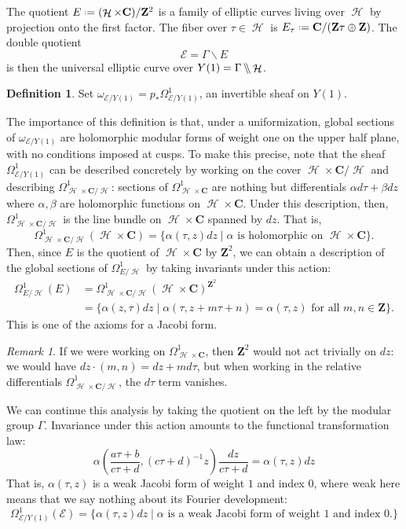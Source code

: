 \documentclass[12pt]{amsart}
\theoremstyle{plain}
\theoremstyle{definition}
\newtheorem{dfn}[thm]{Definition}
\theoremstyle{remark}
\newtheorem{rmk}[thm]{Remark}
\newcommand{\cE}{\mathcal{E}}
\DeclareMathOperator{\uhp}{\mathcal{H}}
\newcommand*{\df}{\mathrel{\vcenter{\baselineskip0.5ex \lineskiplimit0pt
                     \hbox{\scriptsize.}\hbox{\scriptsize.}}} =}
\newcommand{\CC}{\mathbf{C}}
\newcommand{\ZZ}{\mathbf{Z}}
\DeclareMathOperator{\obackslash}{\backslash\hspace{-3pt}\backslash}
\begin{document}
The quotient $E\df (\uhp\times \CC) / \ZZ^2$ is a family of elliptic curves living over $\uhp$ by projection onto the first factor. The fiber over $\tau \in \uhp$ is $E_\tau \df \CC/(\ZZ\tau \oplus\ZZ)$. The double quotient
\[
  \cE = \Gamma \backslash E
\]
is then the universal elliptic curve over $Y(1) = \Gamma \obackslash \uhp$.
\begin{dfn}
Set $\omega_{\cE/Y(1)} = p_*\Omega^1_{\cE/Y(1)}$, an invertible sheaf on $Y(1)$.
\end{dfn}
The importance of this definition is that, under a uniformization, global sections of $\omega_{\cE/Y(1)}$ are holomorphic modular forms of weight one on the upper half plane, with no conditions imposed at cusps. To make this precise, note that the sheaf $\Omega^1_{\cE/Y(1)}$ can be described concretely by working on the cover $\uhp\times \CC /\uhp$ and describing $\Omega^1_{\uhp\times \CC/\uhp}$: sections of $\Omega^1_{\uhp\times \CC}$ are nothing but differentials $\alpha d\tau + \beta dz$ where $\alpha,\beta$ are holomorphic functions on $\uhp \times \CC$. Under this description, then, $\Omega^1_{\uhp\times \CC/\uhp}$ is the line bundle on $\uhp \times \CC$ spanned by $dz$. That is,
\[
\Omega^1_{\uhp \times \CC/\uhp}(\uhp\times \CC) = \{\alpha(\tau,z) dz \mid \alpha \textrm{ is holomorphic on } \uhp \times \CC\}.
\]
Then, since $E$ is the quotient of $\uhp \times \CC$ by $\ZZ^2$, we can obtain a description of the global sections of $\Omega^1_{E/\uhp}$ by taking invariants under this action:
\begin{align*}
    \Omega^1_{E/\uhp}(E) &=\Omega^1_{\uhp \times \CC/\uhp}(\uhp\times \CC)^{\ZZ^2}\\
    &=\{\alpha(z,\tau) dz \mid \alpha(\tau,z+m\tau+n) = \alpha(\tau,z) \textrm{ for all } m,n \in \ZZ\}.
\end{align*}
This is one of the axioms for a Jacobi form.

\begin{rmk}
    If we were working on $\Omega^1_{\uhp \times \CC}$, then $\ZZ^2$ would not act trivially on $dz$: we would have $dz \cdot (m,n) = dz + md\tau$, but when working in the relative differentials $\Omega^1_{\uhp \times \CC/\uhp}$, the $d\tau$ term vanishes.
\end{rmk}

We can continue this analysis by taking the quotient on the left by the modular group $\Gamma$. Invariance under this action amounts to the functional transformation law:
\[
  \alpha\left(\frac{a\tau+b}{c\tau+d}, (c\tau+d)^{-1}z\right) \frac{dz}{c\tau+d} = \alpha(\tau,z)dz
\]
That is, $\alpha(\tau,z)$ is a weak Jacobi form of weight $1$ and index $0$, where weak here means that we say nothing about its Fourier development:
\[
\Omega^1_{\cE/Y(1)}(\cE) = \{\alpha(\tau,z)dz \mid \alpha \textrm{ is a weak Jacobi form of weight } 1 \textrm{ and index } 0.\}
\]
\end{document}
